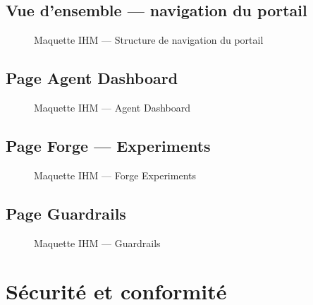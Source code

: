 \subsection{Vue d'ensemble — navigation du portail}

\begin{figure}[H]
  \centering
  
  \caption{Maquette IHM — Structure de navigation du portail}
  \label{fig:ihm_navigation}
\end{figure}

\subsection{Page Agent Dashboard}

\begin{figure}[H]
  \centering
  \caption{Maquette IHM — Agent Dashboard}
  \label{fig:wireframe_dashboard}
\end{figure}

\subsection{Page Forge — Experiments}

\begin{figure}[H]
  \centering
  \caption{Maquette IHM — Forge Experiments}
  \label{fig:wireframe_forge}
\end{figure}

\subsection{Page Guardrails}

\begin{figure}[H]
  \centering
  \caption{Maquette IHM — Guardrails}
  \label{fig:wireframe_guardrails}
\end{figure}

\section{Sécurité et conformité}

